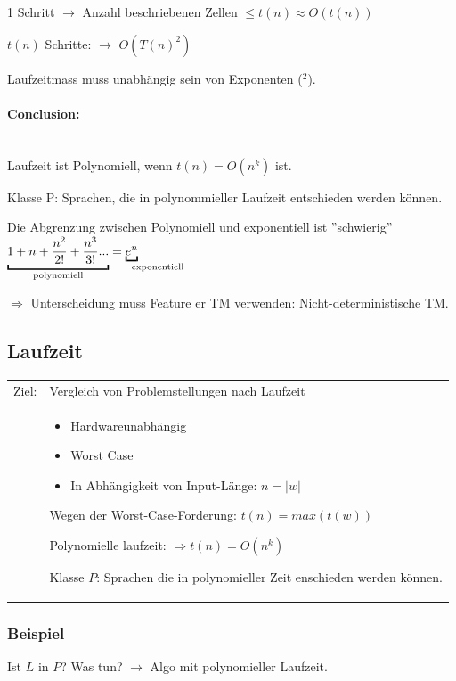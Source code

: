 1 Schritt $\longrightarrow$ Anzahl beschriebenen Zellen $\leq t(n) \approx O(t(n))$

$t(n)$ Schritte: $\longrightarrow$ $O(T(n)^2)$

Laufzeitmass muss unabhängig sein von Exponenten ($^2$).

\paragraph{Conclusion:} \hfill \\
Laufzeit ist Polynomiell, wenn $t(n) = O(n^k)$ ist.

Klasse P: Sprachen, die in polynommieller Laufzeit entschieden werden können.



Die Abgrenzung zwischen Polynomiell und exponentiell ist ''schwierig''
$\underbracket{1 + n + \frac{n^2}{2!} + \frac{n^3}{3!} ... }_{\text{polynomiell}}= \underbracket{e^n}_{\mathrlap{\text{exponentiell}}}$

$\Rightarrow$ Unterscheidung muss Feature er TM verwenden: Nicht-deterministische TM.

\subsection{Laufzeit}

\begin{tabu}{l X}
	Ziel: &Vergleich von Problemstellungen nach Laufzeit \\
		  & \begin{itemize}
			  	\item Hardwareunabhängig
			  	\item Worst Case
			  	\item In Abhängigkeit von Input-Länge: $n=|w|$
		  	\end{itemize}
		  	Wegen der Worst-Case-Forderung: $t(n) = max(t(w))$

			Polynomielle laufzeit: $\Rightarrow t(n) = O(n^k)$
			
			Klasse $P$: Sprachen die in polynomieller Zeit enschieden werden können.
\end{tabu}


\subsubsection{Beispiel}

Ist $L$ in $P$? Was tun? $\longrightarrow$ Algo mit polynomieller Laufzeit.

